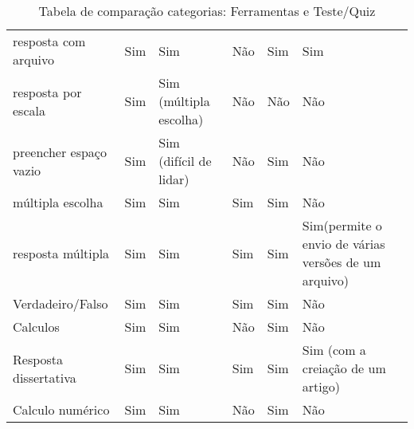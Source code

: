 \begin{table}[h]
\begin{tabular}{@{}p{5cm}|p{3.5cm}|p{3.5cm}|p{2.5cm}|p{2.5cm}|p{3.5cm}@{}}
resposta com arquivo & Sim & Sim & Não & Sim & Sim \\
resposta por escala & Sim & Sim (múltipla escolha) & Não & Não & Não \\
preencher espaço vazio & Sim & Sim (difícil de lidar) & Não & Sim & Não \\
múltipla escolha & Sim & Sim & Sim & Sim & Não \\
resposta múltipla & Sim & Sim & Sim & Sim & Sim(permite o envio de várias versões de um arquivo) \\
Verdadeiro/Falso & Sim & Sim & Sim & Sim & Não \\
Calculos & Sim & Sim & Não & Sim & Não \\
Resposta dissertativa & Sim & Sim & Sim & Sim & Sim (com a creiação de um artigo) \\
Calculo numérico & Sim & Sim & Não & Sim & Não
\end{tabular}
\caption{Tabela de comparação categorias: Ferramentas e Teste/Quiz}
\label{tab:ferramenta-teste}
\end{table}


